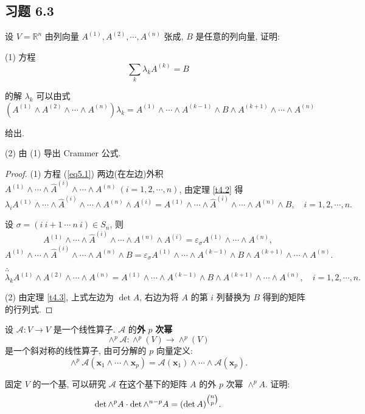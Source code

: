 \documentclass[color=black,device=normal,lang=cn,mode=geye]{elegantnote}
\begin{document}
\subsection{习题 6.3}
\begin{exercise}%
    设 $V=\mathbb{R}^n$ 由列向量 $A^{(1)},A^{(2)},\cdots,A^{(n)}$ 张成, $B$ 是任意的列向量, 证明:
    
    (1) 方程
    \begin{equation}\label{eq5.1}
        \sum\limits_k\lambda_kA^{(k)}=B
    \end{equation}

    的解 $\lambda_k$ 可以由式
    \[(A^{(1)}\wedge A^{(2)}\wedge\cdots\wedge A^{(n)})\lambda_k=A^{(1)}\wedge\cdots\wedge A^{(k-1)}\wedge B\wedge A^{(k+1)}\wedge\cdots\wedge A^{(n)}\]

    给出.

    (2) 由 (1) 导出 Crammer 公式.
\end{exercise}
\begin{proof}
    (1) 方程 (\ref{eq5.1}) 两边(在左边)外积 $A^{(1)}\wedge\cdots\wedge\widehat{A}^{(i)}\wedge\cdots\wedge A^{(n)}\ (i=1,2,\cdots,n)$, 由定理 \ref{t4.2} 得
    \[\lambda_iA^{(1)}\wedge\cdots\wedge\widehat{A}^{(i)}\wedge\cdots\wedge A^{(n)}\wedge A^{(i)}=A^{(1)}\wedge\cdots\wedge\widehat{A}^{(i)}\wedge\cdots\wedge A^{(n)}\wedge B,\quad i=1,2,\cdots,n.\]

    设 $\sigma=(i\ i+1\ \cdots\ n\ i)\in S_n$, 则
    \[A^{(1)}\wedge\cdots\wedge\widehat{A}^{(i)}\wedge\cdots\wedge A^{(n)}\wedge A^{(i)}=\varepsilon_\sigma A^{(1)}\wedge\cdots\wedge A^{(n)},\]
    \[A^{(1)}\wedge\cdots\wedge\widehat{A}^{(i)}\wedge\cdots\wedge A^{(n)}\wedge B=\varepsilon_\sigma A^{(1)}\wedge\cdots\wedge A^{(k-1)}\wedge B\wedge A^{(k+1)}\wedge\cdots\wedge A^{(n)}.\]

    $\therefore$
    \[\lambda_kA^{(1)}\wedge A^{(2)}\wedge\cdots\wedge A^{(n)}=A^{(1)}\wedge\cdots\wedge A^{(k-1)}\wedge B\wedge A^{(k+1)}\wedge\cdots\wedge A^{(n)},\quad i=1,2,\cdots,n.\]

    (2) 由定理 \ref{t4.3}, 上式左边为 $\det A$, 右边为将 $A$ 的第 $i$ 列替换为 $B$ 得到的矩阵的行列式.
\end{proof}
\begin{exercise}%
    设 $\mathcal{A}:V\to V$ 是一个线性算子. $\mathcal{A}$ 的\textbf{外} $p$ \textbf{次幂}
    \[\wedge^p\mathcal{A}:\wedge^p(V)\to\wedge^p(V)\]
    是一个斜对称的线性算子, 由可分解的 $p$ 向量定义:
    \[\wedge^p\mathcal{A}(\boldsymbol{x}_1\wedge\cdots\wedge\boldsymbol{x}_p)=\mathcal{A}(\boldsymbol{x}_1)\wedge\cdots\wedge\mathcal{A}(\boldsymbol{x}_p).\]

    固定 $V$ 的一个基, 可以研究 $\mathcal{A}$ 在这个基下的矩阵 $A$ 的外 $p$ 次幂 $\wedge^pA$. 证明:
    \[\det\wedge^pA\cdot\det\wedge^{n-p}A=(\det A)^{\tbinom{n}{p}}.\]
\end{exercise}
\end{document}
